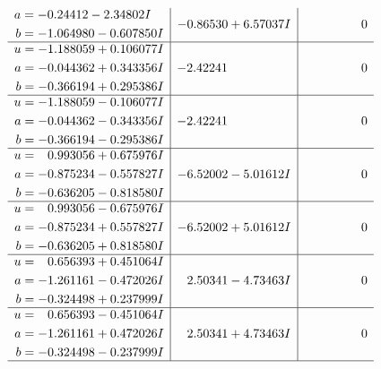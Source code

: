 \documentclass[1p]{elsarticle_modified}
\theoremstyle{definition}
\begin{document}
$$\begin{array}{c|c|c}
\begin{aligned}
a &= -0.24412 - 2.34802 I \\
b &= -1.064980 - 0.607850 I\end{aligned}
 & -0.86530 + 6.57037 I & \phantom{-0.000000 } 0 \\ \hline\begin{aligned}
u &= -1.188059 + 0.106077 I \\
a &= -0.044362 + 0.343356 I \\
b &= -0.366194 + 0.295386 I\end{aligned}
 & -2.42241\phantom{ +0.000000I} & \phantom{-0.000000 } 0 \\ \hline\begin{aligned}
u &= -1.188059 - 0.106077 I \\
a &= -0.044362 - 0.343356 I \\
b &= -0.366194 - 0.295386 I\end{aligned}
 & -2.42241\phantom{ +0.000000I} & \phantom{-0.000000 } 0 \\ \hline\begin{aligned}
u &= \phantom{-}0.993056 + 0.675976 I \\
a &= -0.875234 - 0.557827 I \\
b &= -0.636205 - 0.818580 I\end{aligned}
 & -6.52002 - 5.01612 I & \phantom{-0.000000 } 0 \\ \hline\begin{aligned}
u &= \phantom{-}0.993056 - 0.675976 I \\
a &= -0.875234 + 0.557827 I \\
b &= -0.636205 + 0.818580 I\end{aligned}
 & -6.52002 + 5.01612 I & \phantom{-0.000000 } 0 \\ \hline\begin{aligned}
u &= \phantom{-}0.656393 + 0.451064 I \\
a &= -1.261161 - 0.472026 I \\
b &= -0.324498 + 0.237999 I\end{aligned}
 & \phantom{-}2.50341 - 4.73463 I & \phantom{-0.000000 } 0 \\ \hline\begin{aligned}
u &= \phantom{-}0.656393 - 0.451064 I \\
a &= -1.261161 + 0.472026 I \\
b &= -0.324498 - 0.237999 I\end{aligned}
 & \phantom{-}2.50341 + 4.73463 I & \phantom{-0.000000 } 0\\
 \hline 
 \end{array}$$\newpage$$\begin{array}{c|c|c}  

\end{array}$$
\end{document}
